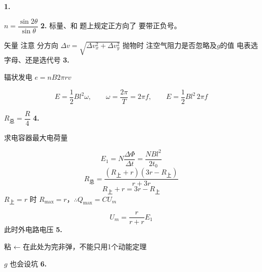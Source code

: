 \textbf{1.}

 $n=\dfrac{\sin 2\theta}{\sin\theta}$ %
\textbf{2.} 标量、和 题上规定正方向了 要带正负号。

矢量 注意 分方向 $\Delta v=\sqrt{\Delta v_x^{2}+\Delta v_y^{2}}$
抛物时 注空气阻力是否忽略及$g$的值 %
电表选字母、还是选代号
\textbf{3.}

辐状发电 $e=nB2\pi rv$

\[ E=\frac12 Bl^{2}\omega,\qquad \omega=\frac{2\pi}{T}=2\pi f,\qquad E=\frac12 Bl^{2}\,2\pi f \]


$R_{\text{总}}=\dfrac{R}{4}$
\textbf{4.}

求电容器最大电荷量

\[ E_1=N\frac{\Delta\Phi}{\Delta t}=\frac{NBl^{2}}{2t_0} \]
\[ R_{\text{总}}=\frac{(R_{\text{上}}+r)(3r-R_{\text{上}})}{r+3r} \]
\[ R_{\text{上}}+r=3r-R_{\text{上}} \]
$R_{\text{上}}=r$ 时 $R_{\max}=r$，$\therefore Q_{\max}=CU_m$

\[ U_m=\frac{r}{r+r}E_1 \]
此时外电路电压  %
\textbf{5.}

粘 ← 在此处为完非弹，不能只用1个动能定理

$g$ 也会设坑
\textbf{6.}

